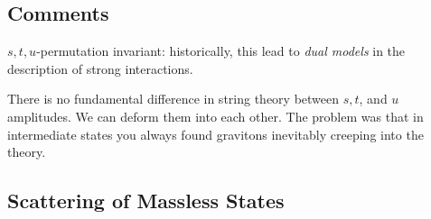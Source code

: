 \subsection*{Comments}%

$s, t, u$-permutation invariant: historically, this lead to \emph{dual models} in the description of strong interactions.
\begin{figure}[tbhp]
  \centering
  \caption{}
  \label{fig:l23f4}
\end{figure}
There is no fundamental difference in string theory between $s, t$, and $u$ amplitudes. We can deform them into each other.  The problem was that in intermediate states you always found gravitons inevitably creeping into the theory.

\subsection{Scattering of Massless States}%
\label{sub:scattering_of_massless_states}

